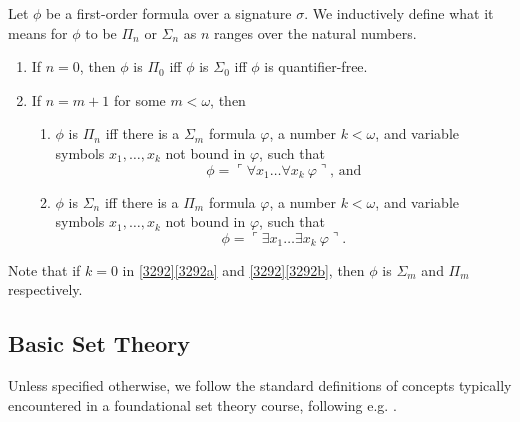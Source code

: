 \documentclass[12pt]{article}
\numberwithin{equation}{section}
\begin{document}
\begin{defi}\label{def25}
Let $\phi$ be a first-order formula over a signature $\sigma$. We inductively define what it means for $\phi$ to be $\Pi_n$ or $\Sigma_n$ as $n$ ranges over the natural numbers.
\begin{enumerate}[label=(\arabic*)]
    \item If $n = 0$, then $\phi$ is $\Pi_0$ iff $\phi$ is $\Sigma_0$ iff $\phi$ is quantifier-free.
    \item\label{3292} If $n = m + 1$ for some $m < \omega$, then 
    \begin{enumerate}[label=(\alph*)]
        \item\label{3292a} $\phi$ is $\Pi_n$ iff there is a $\Sigma_m$ formula $\varphi$, a number $k < \omega$, and variable symbols $x_1, \dots, x_k$ not bound in $\varphi$, such that 
        \begin{equation*}
            \phi = \ulcorner \forall x_1 \dots \forall x_k \ \varphi \urcorner \text{, and}
        \end{equation*}
        \item\label{3292b} $\phi$ is $\Sigma_n$ iff there is a $\Pi_m$ formula $\varphi$, a number $k < \omega$, and variable symbols $x_1, \dots, x_k$ not bound in $\varphi$, such that 
        \begin{equation*}
            \phi = \ulcorner \exists x_1 \dots \exists x_k \ \varphi \urcorner \text{.}
        \end{equation*}
    \end{enumerate}
\end{enumerate}
Note that if $k = 0$ in \ref{3292}\ref{3292a} and \ref{3292}\ref{3292b}, then $\phi$ is $\Sigma_m$ and $\Pi_m$ respectively.
\end{defi}

\subsection{Basic Set Theory}

Unless specified otherwise, we follow the standard definitions of concepts typically encountered in a foundational set theory course, following e.g. \cite{jechhrbacek}.
\end{document}
